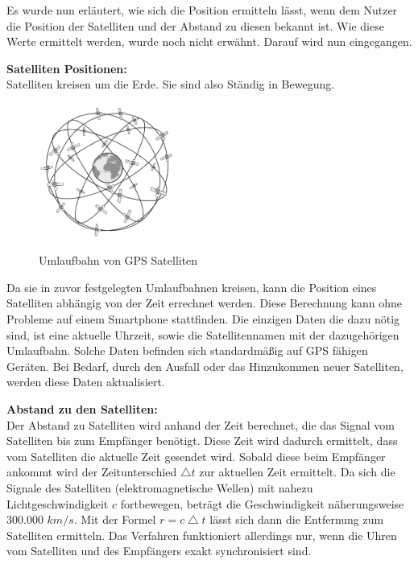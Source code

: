 Es wurde nun erläutert, wie sich die Position ermitteln lässt, wenn dem Nutzer die Position der Satelliten und der Abstand zu diesen bekannt ist. Wie diese Werte ermittelt werden, wurde noch nicht erwähnt. Darauf wird nun eingegangen.

\textbf{Satelliten Positionen:}\\
Satelliten kreisen um die Erde. Sie sind also Ständig in Bewegung. 

\begin{figure}[h]
\centering
\includegraphics[width=0.4\textwidth]{ref/images/GPS_Umlaufbahn.PNG}
\caption[Umlaufbahn von GPS Satelliten]{Umlaufbahn von GPS Satelliten}
\label{fig:Umlaufbahn Satelliten}
\cite[S. 164]{Kuepper2005}
\end{figure}

Da sie in zuvor festgelegten Umlaufbahnen kreisen, kann die Position eines Satelliten abhängig von der Zeit errechnet werden. 
Diese Berechnung kann ohne Probleme auf einem Smartphone stattfinden. Die einzigen Daten die dazu nötig sind, ist eine aktuelle Uhrzeit, sowie die Satellitennamen mit der dazugehörigen Umlaufbahn. Solche Daten befinden sich standardmäßig auf GPS fähigen Geräten. Bei Bedarf, durch den Ausfall oder das Hinzukommen neuer Satelliten, werden diese Daten aktualisiert.
\cite[S. 189]{Schiller2004}


\textbf{Abstand zu den Satelliten:}\\
Der Abstand zu Satelliten wird anhand der Zeit berechnet, die das Signal vom Satelliten bis zum Empfänger benötigt. Diese Zeit wird dadurch ermittelt, dass vom Satelliten die aktuelle Zeit gesendet wird. Sobald diese beim Empfänger ankommt wird der Zeitunterschied $ \bigtriangleup t $ zur aktuellen Zeit ermittelt. Da sich die Signale des Satelliten (elektromagnetische Wellen) mit nahezu Lichtgeschwindigkeit $ c $ fortbewegen, beträgt die Geschwindigkeit näherungsweise 300.000 $km/s$. Mit der Formel $ r = c \bigtriangleup t$ lässt sich dann die Entfernung zum Satelliten ermitteln. Das Verfahren funktioniert allerdings nur, wenn die Uhren vom Satelliten und des Empfängers exakt synchronisiert sind. 
\cite[S. 189]{Schiller2004}

